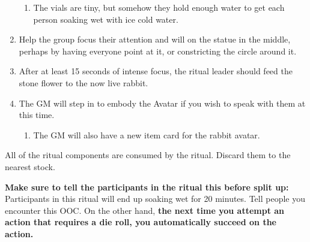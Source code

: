 \documentclass[green]{GL2020}
\begin{document}
\begin{enumerate}
    \begin{enumerate}
      \item The vials are tiny, but somehow they hold enough water to get each person soaking wet with ice cold water.
    \end{enumerate}
  \item Help the group focus their attention and will on the statue in the middle, perhaps by having everyone point at it, or constricting the circle around it.
  \item After at least 15 seconds of intense focus, the ritual leader should feed the stone flower to the now live rabbit.
  \item The GM will step in to embody the Avatar if you wish to speak with them at this time.
    \begin{enumerate}
      \item The GM will also have a new item card for the rabbit avatar.
    \end{enumerate}
\end{enumerate}

All of the ritual components are consumed by the ritual. Discard them to the nearest stock.

\textbf{Make sure to tell the participants in the ritual this before split up:} Participants in this ritual will end up soaking wet for 20 minutes. Tell people you encounter this OOC. On the other hand, \textbf{the next time you attempt an action that requires a die roll, you automatically succeed on the action.}
\end{document}
